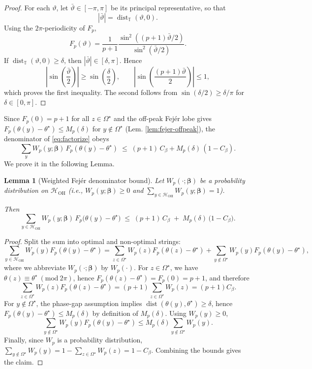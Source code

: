 \documentclass[a4paper,unpublished,onecolumn,11pt]{quantumarticle}
\newtheorem{lemma}[theorem]{Lemma}
\theoremstyle{definition}
\theoremstyle{remark}
\newcommand{\OH}{\mathcal{H}_{\mathrm{OH}}}
\begin{document}
\begin{proof}
For each $\vartheta$, let $\bar\vartheta\in[-\pi,\pi]$ be its
principal representative, so that
\[
|\bar\vartheta|
=
\operatorname{dist}_{\mathbb T}(\vartheta,0).
\]
Using the $2\pi$-periodicity of $F_p$,
\[
F_p(\vartheta)
=
\frac{1}{p+1}
\frac{\sin^2((p+1)\bar\vartheta/2)}
     {\sin^2(\bar\vartheta/2)}.
\]
If $\operatorname{dist}_{\mathbb T}(\vartheta,0)\ge\delta$, then
$|\bar\vartheta|\in[\delta,\pi]$. Hence
\[
\left|\sin\!\left(\frac{\bar\vartheta}{2}\right)\right|
\ge
\sin\!\left(\frac{\delta}{2}\right),
\qquad
\left|\sin\!\left(\frac{(p+1)\bar\vartheta}{2}\right)\right|
\le 1,
\]
which proves the first inequality. The second follows from
$\sin(\delta/2)\ge\delta/\pi$ for $\delta\in[0,\pi]$.
\end{proof}




Since \(F_p(0)=p+1\) for all \(z\in\Omega^\star\) and the off-peak Fej\'er lobe gives
\(F_p(\theta(y)-\theta^\star)\le M_p(\delta)\) for \(y\notin\Omega^\star\) (Lem. \ref{lem:fejer-offpeak}), the denominator of
\eqref{eq:factorize} obeys
\[
  \sum_{y} W_p(y;\boldsymbol\beta)\,F_p(\theta(y)-\theta^\star)
  \;\le\;
  (p+1)\,C_{\beta} + M_p(\delta)\,(1-C_{\beta}).
\]
We prove it in the following Lemma.
\begin{lemma}[Weighted Fej\'er denominator bound]
\label{lem:denom-bound}
Let $W_p(\cdot;\boldsymbol\beta)$ be a probability distribution on $\OH$ (i.e., $W_p(y;\boldsymbol\beta)\ge 0$ and $\sum_{y\in\OH}W_p(y;\boldsymbol\beta)=1$).

Then
\[
  \sum_{y\in\OH} W_p(y;\boldsymbol\beta)\,F_p\!\bigl(\theta(y)-\theta^\star\bigr)
  \;\le\;
  (p+1)\,C_{\beta} \;+\; M_p(\delta)\,\bigl(1-C_{\beta}\bigr).
\]
\end{lemma}

\begin{proof}
Split the sum into optimal and non-optimal strings:
\[
\sum_{y\in\OH} W_p(y)F_p(\theta(y)-\theta^\star)
=
\sum_{z\in\Omega^\star} W_p(z)F_p(\theta(z)-\theta^\star)
+
\sum_{y\notin\Omega^\star} W_p(y)F_p(\theta(y)-\theta^\star),
\]
where we abbreviate $W_p(\cdot;\boldsymbol\beta)$ by $W_p(\cdot)$.
For $z\in\Omega^\star$, we have $\theta(z)\equiv\theta^\star\ (\mathrm{mod}\ 2\pi)$, hence
$F_p(\theta(z)-\theta^\star)=F_p(0)=p+1$, and therefore
\[
\sum_{z\in\Omega^\star} W_p(z)F_p(\theta(z)-\theta^\star)=(p+1)\sum_{z\in\Omega^\star}W_p(z)
=(p+1)C_\beta.
\]
For $y\notin\Omega^\star$, the phase-gap assumption implies
$\operatorname{dist}(\theta(y),\theta^\star)\ge\delta$, hence
$F_p(\theta(y)-\theta^\star)\le M_p(\delta)$ by definition of $M_p(\delta)$.
Using $W_p(y)\ge 0$,
\[
\sum_{y\notin\Omega^\star} W_p(y)F_p(\theta(y)-\theta^\star)
\le
M_p(\delta)\sum_{y\notin\Omega^\star} W_p(y).
\]
Finally, since $W_p$ is a probability distribution,
$\sum_{y\notin\Omega^\star} W_p(y)=1-\sum_{z\in\Omega^\star}W_p(z)=1-C_\beta$.
Combining the bounds gives the claim.
\end{proof}
\end{document}
